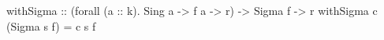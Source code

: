 \begin{code}
withSigma
    :: (forall (a :: k). Sing a -> f a -> r)
    -> Sigma f
    -> r
withSigma c (Sigma s f) = c s f
\end{code}
